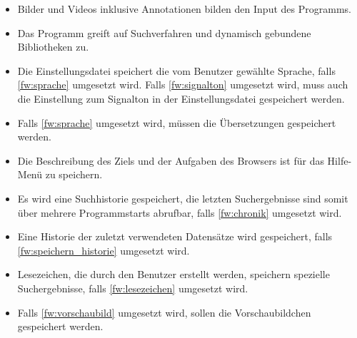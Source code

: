 \begin{itemize}
	\item Bilder und Videos inklusive Annotationen bilden den Input des Programms.
	\item Das Programm greift auf Suchverfahren und dynamisch gebundene Bibliotheken zu.
	\item Die Einstellungsdatei speichert die vom Benutzer gewählte Sprache, falls \ref{fw:sprache} umgesetzt wird. Falls \ref{fw:signalton} umgesetzt wird, muss auch die Einstellung zum Signalton in der Einstellungsdatei gespeichert werden.
	\item Falls \ref{fw:sprache} umgesetzt wird, müssen die Übersetzungen gespeichert werden.
	\item Die Beschreibung des Ziels und der Aufgaben des Browsers ist für das Hilfe-Menü zu speichern.
	\item Es wird eine Suchhistorie gespeichert, die letzten Suchergebnisse sind somit über mehrere Programmstarts abrufbar, falls \ref{fw:chronik} umgesetzt wird. 
	\item Eine Historie der zuletzt verwendeten Datensätze wird gespeichert, falls \ref{fw:speichern_historie} umgesetzt wird.
	\item Lesezeichen, die durch den Benutzer erstellt werden, speichern spezielle Suchergebnisse, falls \ref{fw:lesezeichen} umgesetzt wird.
	\item Falls \ref{fw:vorschaubild} umgesetzt wird, sollen die Vorschaubildchen gespeichert werden.
\end{itemize}
\pagebreak
